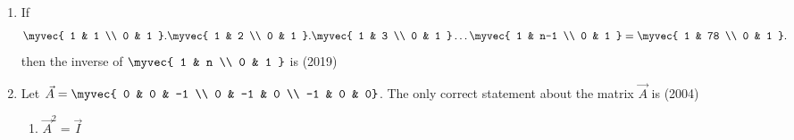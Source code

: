 \begin{enumerate}
\begin{enumerate}
\end{enumerate} 
\item If \begin{align*}\myvec{
    1 & 1 \\
    0 & 1
}.\myvec{
    1 & 2 \\
    0 & 1
}.\myvec{
    1 & 3 \\
    0 & 1
}\dots \myvec{
    1 & n-1 \\
    0 & 1
}=\myvec{
    1 & 78 \\
    0 & 1
}.\end{align*}
then the inverse of $\myvec{
    1 & n \\
    0 & 1
}$ is 
\hfill{(2019)} 
\begin{enumerate}
\end{enumerate}
	\item Let $\vec{A}=\myvec{
			0 & 0 & -1 \\
			0 & -1 & 0 \\
			-1 & 0 & 0}$. The only correct statement about the matrix $\vec{A}$ is \hfill{(2004)}
\begin{multicols}{2}
		\begin{enumerate}
			\item $\vec{A}^2=\vec{I}$

\end{enumerate}
\end{multicols}
\end{enumerate}
